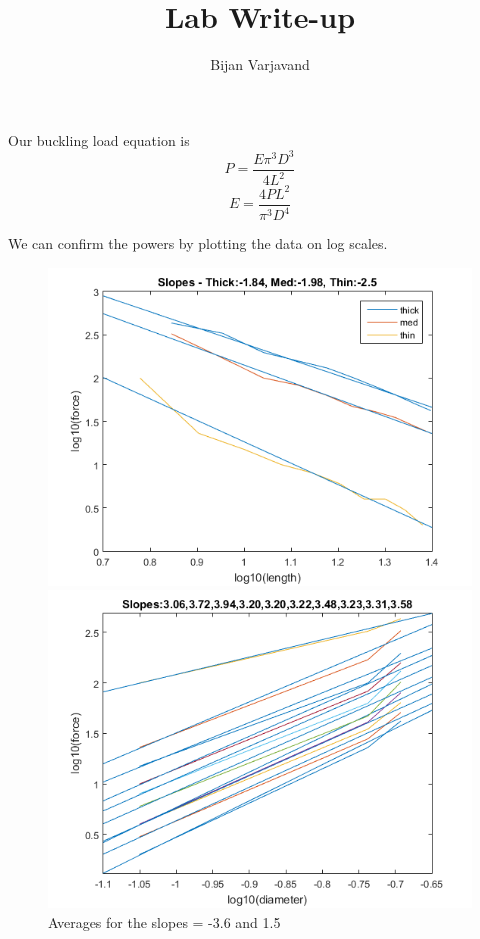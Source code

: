 \documentclass{article}
\author{Bijan Varjavand}
\title{Lab Write-up}
\begin{document}
\maketitle

Our buckling load equation is
$$P = \frac{E\pi ^3D^3}{4L^2}$$
$$E = \frac{4PL^2}{\pi ^3D^4}$$

We can confirm the powers by plotting the data on log scales.

\begin{figure}[h]
	\centering
	\begin{minipage}{0.5\textwidth}
		\includegraphics[scale=0.3]{Lab1f1.png}
	\end{minipage}%
	\begin{minipage}{0.5\textwidth}
		\includegraphics[scale=0.3]{Lab1f3.png}
	\end{minipage}
	\caption{Averages for the slopes = -3.6 and 1.5}
\end{figure}
\end{document}
